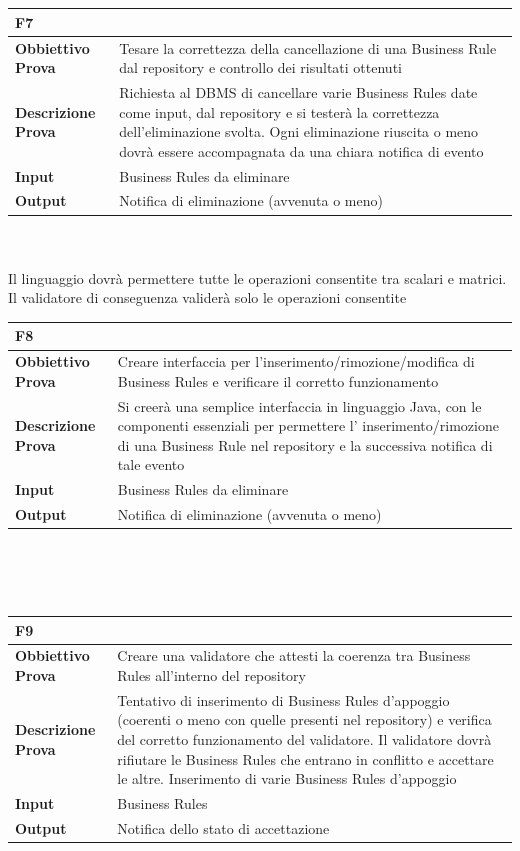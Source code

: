 \documentclass[11pt,titlepage,a4paper]{report}
\begin{document}
\\
\\
\begin{tabular}{||p{4.5cm}||p{7.5cm}||}
\hline
\textbf{\textsf{F7}} \\
\hline
{\textbf {Obbiettivo Prova}}& Tesare la correttezza della cancellazione di una Business Rule dal repository e controllo dei risultati ottenuti\\ \hline
{\textbf{Descrizione Prova}}&  Richiesta al DBMS di cancellare varie Business Rules date come input, dal repository e si tester\`a la correttezza dell'eliminazione svolta. Ogni eliminazione riuscita o meno dovr\`a essere accompagnata da una chiara notifica di evento\\ \hline
{\textbf{Input}}& Business Rules da eliminare \\ \hline
{\textbf{Output}}& Notifica di eliminazione (avvenuta o meno) \\ \hline
\end{tabular} \\
\\Il linguaggio dovr\`a permettere tutte le operazioni consentite tra scalari e matrici. Il validatore di conseguenza valider\`a solo le operazioni consentite
\\
\begin{tabular}{||p{4.5cm}||p{7.5cm}||}
\hline
\textbf{\textsf{F8}} \\
\hline
{\textbf {Obbiettivo Prova}}& Creare interfaccia per l'inserimento/rimozione/modifica di Business Rules e verificare il corretto funzionamento\\ \hline
{\textbf{Descrizione Prova}}& Si creer\`a  una semplice interfaccia in linguaggio Java, con le componenti essenziali per permettere l' inserimento/rimozione di una Business Rule nel repository e la successiva notifica di tale evento \\ \hline
{\textbf{Input}}& Business Rules da eliminare \\ \hline
{\textbf{Output}}& Notifica di eliminazione (avvenuta o meno) \\ \hline
\end{tabular} \\
\\
\\
\begin{tabular}{||p{4.5cm}||p{7.5cm}||}
\hline
\textbf{\textsf{F9}} \\
\hline
{\textbf {Obbiettivo Prova}}& Creare una validatore che attesti la coerenza tra Business Rules all'interno del repository \\ \hline
{\textbf{Descrizione Prova}}& Tentativo di inserimento di Business Rules d'appoggio (coerenti o meno con quelle presenti nel repository) e verifica del corretto funzionamento del validatore. Il validatore dovr\`a rifiutare le Business Rules che entrano in conflitto e accettare le altre. Inserimento di varie Business Rules d'appoggio  \\ \hline
{\textbf{Input}}& Business Rules \\ \hline
{\textbf{Output}}& Notifica dello stato di accettazione \\ \hline
\end{tabular} \\
\end{document}
